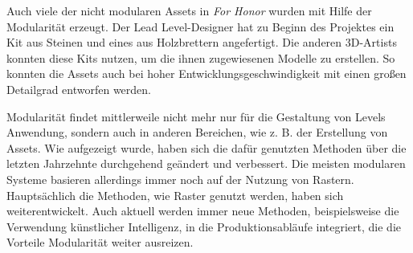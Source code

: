 Auch viele der nicht modularen Assets in \textit{For Honor} wurden mit Hilfe der Modularität erzeugt. Der Lead Level-Designer hat zu Beginn des Projektes ein Kit aus Steinen und eines aus Holzbrettern angefertigt. Die anderen 3D-Artists konnten diese Kits nutzen, um die ihnen zugewiesenen Modelle zu erstellen. So konnten die Assets auch bei hoher Entwicklungsgeschwindigkeit mit einen großen Detailgrad entworfen werden. \parencite{ForHonor}
\par
Modularität findet mittlerweile nicht mehr nur für die Gestaltung von Levels Anwendung, sondern auch in anderen Bereichen, wie z. B. der Erstellung von Assets. Wie aufgezeigt wurde, haben sich die dafür genutzten Methoden über die letzten Jahrzehnte durchgehend geändert und verbessert. Die meisten modularen Systeme basieren allerdings immer noch auf der Nutzung von Rastern. Hauptsächlich die Methoden, wie Raster genutzt werden, haben sich weiterentwickelt. Auch aktuell werden immer neue Methoden, beispielsweise die Verwendung künstlicher Intelligenz, in die Produktionsabläufe integriert, die die Vorteile Modularität weiter ausreizen.
\newpage

